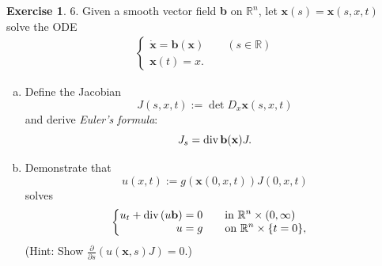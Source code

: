 \documentclass[a4paper]{book}
\numberwithin{equation}{chapter}
\theoremstyle{definition}
\newtheorem{exc}[exm]{Exercise}
\begin{document}
\begin{exc}
  6.  Given a smooth vector field \textbf{b} on $\mathbb{R}^n$, let $\mathbf{x}(s) = \mathbf{x}(s,x,t)$ solve the ODE
  \begin{eqnarray} \label{eq:6:6:6}
    \begin{cases}
      \dot{\mathbf{x}} = \mathbf{b}(\mathbf{x}) \qquad (s \in \mathbb{R}) \\
      \mathbf{x}(t) = x.
    \end{cases}
  \end{eqnarray}
  \begin{enumerate}[(a)]
  \item Define the Jacobian
    \begin{equation}
      \label{eq:6:5:1}
      J(s,x,t) := \det D_x\mathbf{x}(s,x,t)
    \end{equation}
    and derive \textit{Euler's formula}:
    \begin{equation}
      \label{eq:6:5:2}
      J_s = \textmd{div}\, \mathbf{b(x)}J.
    \end{equation}

  \item Demonstrate that
    \begin{equation}
      \label{eq:6:5:3}
      u(x,t) := g(\mathbf{x}(0,x,t))J(0,x,t)
    \end{equation}
    solves
    \begin{eqnarray}
      \label{eq:6:5:4}
      \begin{cases}
        \begin{aligned}
        u_t + \textmd{div}\,(u\mathbf{b}) &= 0 \qquad \textmd{in } \mathbb{R}^n \times (0,\infty) \\
        u &= g \qquad \textmd{on } \mathbb{R}^n \times \{t = 0\},
        \end{aligned}
      \end{cases}
    \end{eqnarray}
    (Hint: Show $\frac{\partial}{\partial s}(u(\mathbf{x},s)J) = 0$.)
  \end{enumerate}
\end{exc}
\end{document}
